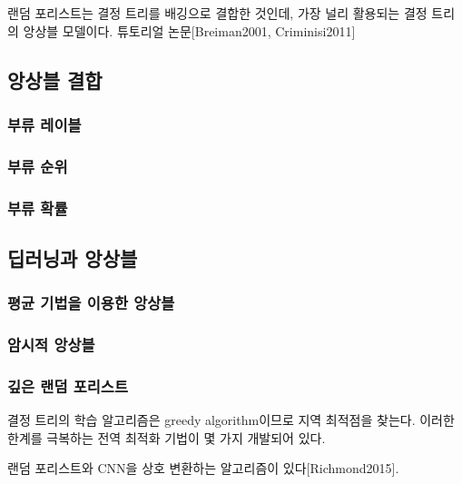 \documentclass [12pt] {oblivoir}
\let\oldsubsubsection=\subsubsection
\renewcommand{\subsubsection}
{
  \filbreak
  \oldsubsubsection
}
\begin{document}
랜덤 포리스트는 결정 트리를 배깅으로 결합한 것인데, 가장 널리 활용되는 결정 트리의 앙상블 모델이다. 튜토리얼 논문[Breiman2001, Criminisi2011]

\subsection{앙상블 결합}

\subsubsection{부류 레이블}

\subsubsection{부류 순위}

\subsubsection{부류 확률}

\subsection{딥러닝과 앙상블}

\subsubsection{평균 기법을 이용한 앙상블}

\subsubsection{암시적 앙상블}

\subsubsection{깊은 랜덤 포리스트}

결정 트리의 학습 알고리즘은 greedy algorithm이므로 지역 최적점을 찾는다. 이러한 한계를 극복하는 전역 최적화 기법이 몇 가지 개발되어 있다.

\vspace{3mm}
랜덤 포리스트와 CNN을 상호 변환하는 알고리즘이 있다[Richmond2015].
\end{document}
